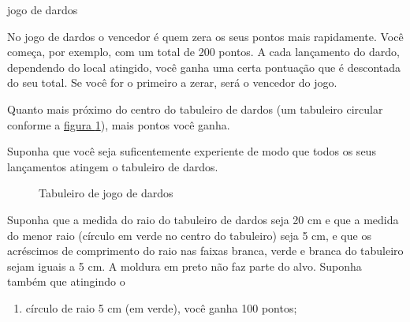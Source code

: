 \begin{task}{jogo de dardos}



No jogo de dardos o vencedor é quem zera os seus pontos mais rapidamente. Você começa, por exemplo, com um total de 200 pontos. A cada lançamento do dardo, dependendo do local atingido, você ganha uma certa pontuação que é descontada do seu total. Se você for o primeiro a zerar, será o vencedor do jogo.

Quanto mais próximo do centro do tabuleiro de dardos (um tabuleiro circular conforme a \hyperref[dardos]{figura \ref{dardos}}), mais pontos você ganha.

Suponha que você seja suficentemente experiente de modo que todos os seus lançamentos atingem o tabuleiro de dardos.

\begin{figure}[H]
\centering


\caption{Tabuleiro de jogo de dardos}
\label{dardos}
\end{figure}

Suponha que a medida do raio do tabuleiro de dardos seja 20 cm e que a medida do menor raio (círculo em verde no centro do tabuleiro) seja 5 cm, e que os acréscimos de comprimento do raio nas faixas branca, verde e branca do tabuleiro sejam iguais a 5 cm. A moldura em preto não faz parte do alvo. Suponha também que atingindo o
\begin{enumerate}
\item {} 
círculo de raio 5 cm (em verde), você ganha 100 pontos;


\end{enumerate}
\end{task}
